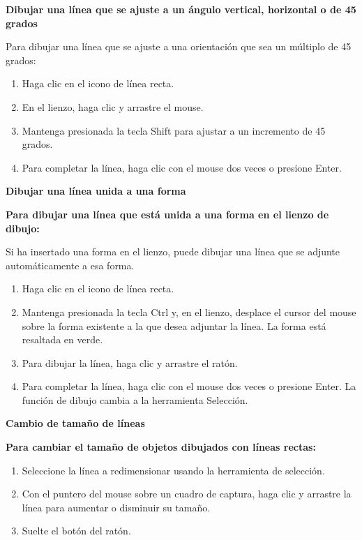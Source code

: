 \textbf{Dibujar una línea que se ajuste a un ángulo vertical, horizontal o de 45 grados}

Para dibujar una línea que se ajuste a una orientación que sea un múltiplo de 45 grados:
\begin{enumerate}
  \item Haga clic en el icono de línea recta.

\item En el lienzo, haga clic y arrastre el mouse.

\item Mantenga presionada la tecla Shift para ajustar a un incremento de 45 grados.

\item Para completar la línea, haga clic con el mouse dos veces o presione Enter.
\end{enumerate}

\textbf{Dibujar una línea unida a una forma}

\textbf{Para dibujar una línea que está unida a una forma en el lienzo de dibujo:}

Si ha insertado una forma en el lienzo, puede dibujar una línea que se adjunte automáticamente a esa forma.
\begin{enumerate}
  \item Haga clic en el icono de línea recta.

\item Mantenga presionada la tecla Ctrl y, en el lienzo, desplace el cursor del mouse sobre la forma existente a la que desea adjuntar la línea. La forma está resaltada en verde.

\item Para dibujar la línea, haga clic y arrastre el ratón.

\item Para completar la línea, haga clic con el mouse dos veces o presione Enter. La función de dibujo cambia a la herramienta Selección.
\end{enumerate}

\textbf{Cambio de tamaño de líneas}

\textbf{Para cambiar el tamaño de objetos dibujados con líneas rectas:}

\begin{enumerate}
  \item Seleccione la línea a redimensionar usando la herramienta de selección.

\item Con el puntero del mouse sobre un cuadro de captura, haga clic y arrastre la línea para aumentar o disminuir su tamaño.

\item Suelte el botón del ratón.
\end{enumerate}

